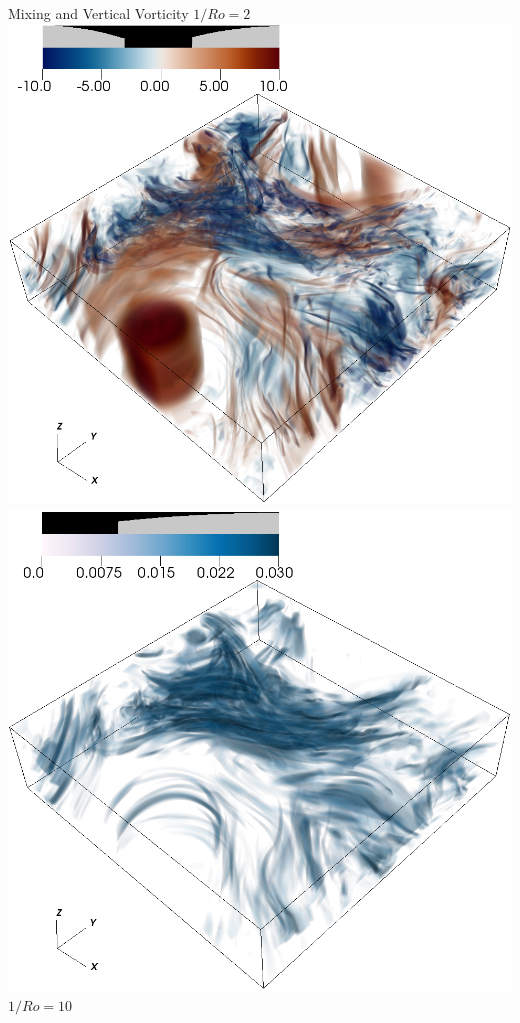 \documentclass{beamer}
\begin{document}
\begin{frame}{Mixing and Vertical Vorticity}
    \emp
        \centering
        $1/Ro = 2$
        \includegraphics[width=.95\textwidth]{images/vortz_Om2_vr2.png}
        \includegraphics[width=.95\textwidth]{images/chi_Om2_vr2.png}
    \emp
        \centering
        $1/Ro = 10$

\end{frame}
\end{document}
